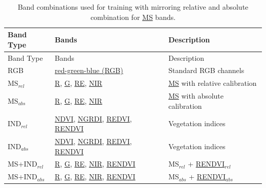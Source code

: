 \documentclass[
]{scrreprt}
\begin{document}
\begin{longtable}[]{@{}
  >{\raggedright\arraybackslash}p{}
  >{\raggedright\arraybackslash}p{}
  >{\raggedright\arraybackslash}p{}@{}}
\caption{Band combinations used for training with mirroring relative and
absolute combination for \hyperref[acronyms_MS]{MS}
bands.}\label{tbl-band-combinations}\tabularnewline
\toprule\noalign{}
\begin{minipage}[b]{\linewidth}\raggedright
Band Type
\end{minipage} & \begin{minipage}[b]{\linewidth}\raggedright
Bands
\end{minipage} & \begin{minipage}[b]{\linewidth}\raggedright
Description
\end{minipage} \\
\midrule\noalign{}
\endfirsthead
\toprule\noalign{}
\begin{minipage}[b]{\linewidth}\raggedright
Band Type
\end{minipage} & \begin{minipage}[b]{\linewidth}\raggedright
Bands
\end{minipage} & \begin{minipage}[b]{\linewidth}\raggedright
Description
\end{minipage} \\
\midrule\noalign{}
\endhead
\bottomrule\noalign{}
\endlastfoot
RGB & \hyperref[acronyms_RGB]{red-green-blue (RGB)} & Standard RGB
channels \\
MS\(_{rel}\) & \hyperref[acronyms_R]{R}, \hyperref[acronyms_G]{G},
\hyperref[acronyms_RE]{RE}, \hyperref[acronyms_NIR]{NIR} &
\hyperref[acronyms_MS]{MS} with relative calibration \\
MS\(_{abs}\) & \hyperref[acronyms_R]{R}, \hyperref[acronyms_G]{G},
\hyperref[acronyms_RE]{RE}, \hyperref[acronyms_NIR]{NIR} &
\hyperref[acronyms_MS]{MS} with absolute calibration \\
IND\(_{rel}\) & \hyperref[acronyms_NDVI]{NDVI},
\hyperref[acronyms_NGRDI]{NGRDI}, \hyperref[acronyms_REDVI]{REDVI},
\hyperref[acronyms_RENDVI]{RENDVI} & Vegetation indices \\
IND\(_{abs}\) & \hyperref[acronyms_NDVI]{NDVI},
\hyperref[acronyms_NGRDI]{NGRDI}, \hyperref[acronyms_REDVI]{REDVI},
\hyperref[acronyms_RENDVI]{RENDVI} & Vegetation indices \\
MS+IND\(_{rel}\) & \hyperref[acronyms_R]{R}, \hyperref[acronyms_G]{G},
\hyperref[acronyms_RE]{RE}, \hyperref[acronyms_NIR]{NIR},
\hyperref[acronyms_RENDVI]{RENDVI} & MS\(_{rel}\) +
\hyperref[acronyms_RENDVI]{RENDVI}\(_{rel}\) \\
MS+IND\(_{abs}\) & \hyperref[acronyms_R]{R}, \hyperref[acronyms_G]{G},
\hyperref[acronyms_RE]{RE}, \hyperref[acronyms_NIR]{NIR},
\hyperref[acronyms_RENDVI]{RENDVI} & MS\(_{abs}\) +
\hyperref[acronyms_RENDVI]{RENDVI}\(_{abs}\) \\
\end{longtable}
\end{document}
